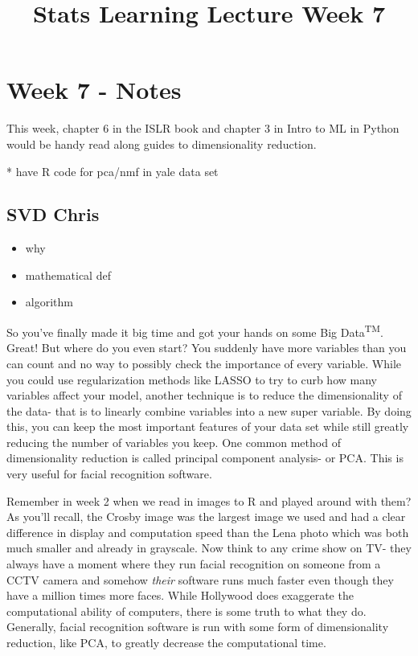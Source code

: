 \documentclass[a4paper]{article}
\title{Stats Learning Lecture Week 7}
\begin{document}
\section{Week 7 - Notes}

This week, chapter 6 in the ISLR book and chapter 3 in Intro to ML in Python would be handy read along guides to dimensionality reduction.

* have R code for pca/nmf in yale data set

\subsection{SVD \textbf{Chris}}
\begin{itemize}
\item why
\item mathematical def
\item algorithm
\end{itemize}


So you've finally made it big time and got your hands on some Big Data\textsuperscript{TM}. Great! But where do you even start? You suddenly have more variables than you can count and no way to possibly check the importance of every variable. While you could use regularization methods like LASSO to try to curb how many variables affect your model, another technique is to reduce the dimensionality of the data- that is to linearly combine variables into a new super variable. By doing this, you  can keep the most important features of your data set while still greatly reducing the number of variables you keep. One common method of dimensionality reduction is called principal component analysis- or PCA. This is very useful for facial recognition software. 

Remember in week 2 when we read in images to R and played around with them? As you'll recall, the Crosby image was the largest image we used and had a clear difference in display and computation speed than the Lena photo which was both much smaller and already in grayscale. Now think to any crime show on TV- they always have a moment where they run facial recognition on someone from a CCTV camera and somehow \textit{their} software runs much faster even though they have a million times more faces. While Hollywood does exaggerate the computational ability of computers, there is some truth to what they do. Generally, facial recognition software is run with some form of dimensionality reduction, like PCA, to greatly decrease the computational time. 
\end{document}
